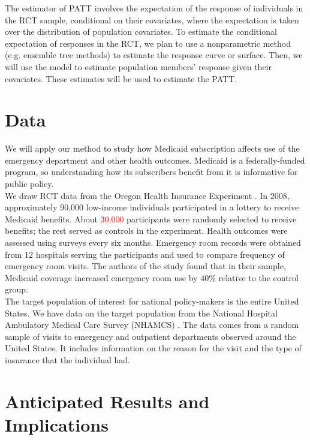 \documentclass{article}
\begin{document}
The estimator of PATT involves the expectation of the response of individuals in the RCT sample, conditional on their covariates, where the expectation is taken over the distribution of population covariates.  To estimate the conditional expectation of responses in the RCT, we plan to use a nonparametric method (e.g. ensemble tree methods) to estimate the response curve or surface.  Then, we will use the model to estimate population members' response given their covariates.  These estimates will be used to estimate the PATT.

\section{Data}
We will apply our method to study how Medicaid subscription affects use of the emergency department and other health outcomes.  Medicaid is a federally-funded program, so understanding how its subscribers benefit from it is informative for public policy. \\

We draw RCT data from the Oregon Health Insurance Experiment \cite{Taubman}.  In 2008, approximately 90,000 low-income individuals participated in a lottery to receive Medicaid benefits.  About \textcolor{red}{30,000} participants were randomly selected to receive benefits; the rest served as controls in the experiment.  Health outcomes were assessed using surveys every six months.  Emergency room records were obtained from $12$ hospitals serving the participants and used to compare frequency of emergency room visits.  The authors of the study found that in their sample, Medicaid coverage increased emergency room use by $40\%$ relative to the control group. \\

The target population of interest for national policy-makers is the entire United States.  We have data on the target population from the National Hospital Ambulatory Medical Care Survey (NHAMCS) \cite{NHAMCS}.  The data comes from a random sample of visits to emergency and outpatient departments observed around the United States.  It includes information on the reason for the visit and the type of insurance that the individual had.

\section{Anticipated Results and Implications}




\end{document}
